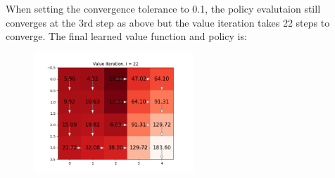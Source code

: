 \documentclass[submit]{harvardml}
\begin{document}
\begin{enumerate}
    When setting the convergence tolerance to 0.1, the policy evalutaion still converges at the 3rd step as above but the value iteration takes 22 steps to converge. The final learned value function and policy is:
    \begin{figure}[H]
        \includegraphics[width=6cm]{hw6/plots/all/ct/Value_22.png}
        \centering
    \end{figure}
    
    
\end{enumerate}





\newpage
\end{document}
